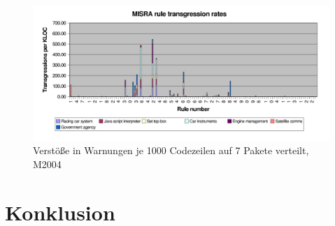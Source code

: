 \documentclass[a4paper,UKenglish,cleveref, autoref]{templates/lipics-v2019}
\begin{document}
    \begin{figure}[H]
        \centering
        \captionsetup{justification=centering,margin=2cm}
        \includegraphics[width=\textwidth]{graphics/2004-transgression-rates.png}
        \caption{Verstöße in Warnungen je 1000 Codezeilen auf 7 Pakete verteilt, M2004\cite{hatton2007language}}
    \end{figure}

    \section{Konklusion}
    \label{sec:konklusion}



    
\end{document}
